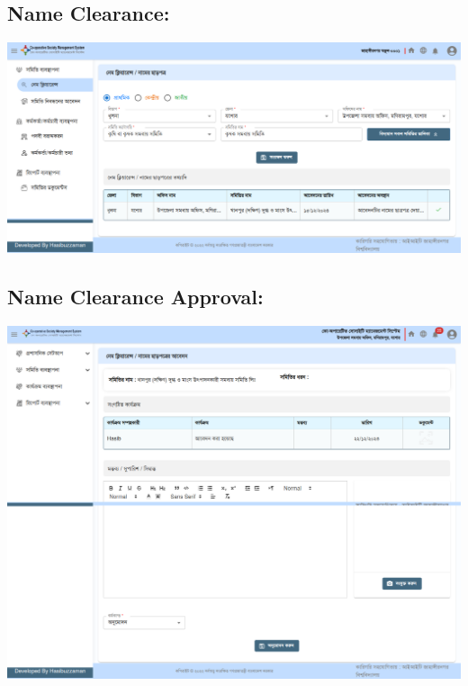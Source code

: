 \subsection{Name Clearance:}
  \includegraphics[width=14cm]{Chap4/5.png}

\subsection{Name Clearance Approval:}
  \includegraphics[width=14cm]{Chap4/nameclearance-approval.png}

